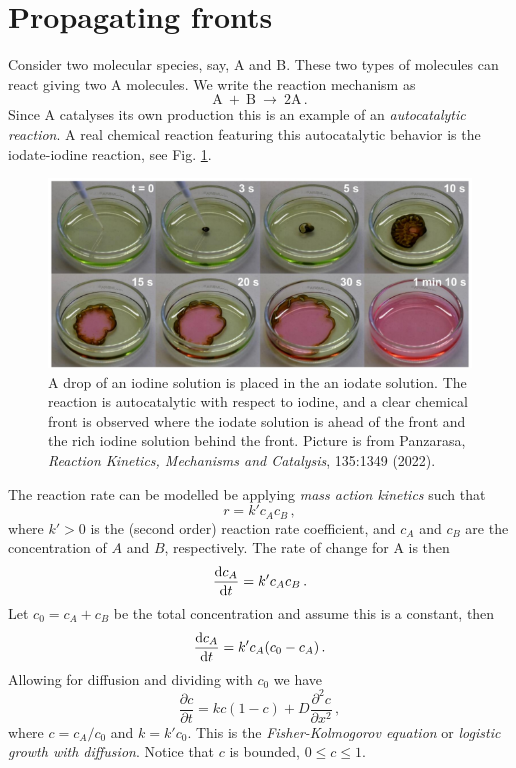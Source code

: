 \section{Propagating fronts}
Consider two molecular species, say, A and B. These two types of molecules can react giving two A
molecules. We write the reaction mechanism as
\begin{equation}
  \text{A} \ + \ \text{B} \ \rightarrow \ 2\text{A} \, . \label{react:FK} 
\end{equation}
Since A catalyses its own production this is an example of an \emph{autocatalytic
reaction}. A real chemical reaction featuring this autocatalytic behavior is the
iodate-iodine reaction, see Fig. \ref{fig:iodateiodine}.
\begin{figure}[h!]
	\begin{center}
		\includegraphics[scale=0.45]{figs/IodateIodine.png}
		\caption{\label{fig:iodateiodine}
		A drop of an iodine solution is placed in the an iodate solution. The reaction is 
		autocatalytic with respect to iodine, and a clear chemical front is observed where
		the iodate solution is ahead of the front and the rich iodine solution behind the front.
		Picture is from Panzarasa, \emph{Reaction Kinetics, Mechanisms and Catalysis}, 135:1349 (2022).
		}
	\end{center}
\end{figure}

The reaction rate can be modelled be applying \emph{mass action kinetics} such that
\begin{equation}
	\label{eq:rkcacb}
  r = k'c_Ac_B \, ,
\end{equation}
where $k'>0$ is the (second order) reaction rate coefficient, and $c_A$ and $c_B$ are the
concentration of $A$ and $B$, respectively. The rate of change for A is then
\begin{equation}
\label{eq:dcAdt}
  \frac{\mathrm{d} c_A}{\mathrm{d} t} = k'c_Ac_B \, .
\end{equation}
Let $c_0=c_A+c_B$ be the total concentration and assume this is a constant, then
\begin{equation}
  \frac{\mathrm{d} c_A}{\mathrm{d} t} = k'c_A(c_0 - c_A) \, .
\end{equation}
Allowing for diffusion and dividing with $c_0$ we have 
\begin{equation}
\frac{\partial c}{\partial t} = kc(1-c) + D \frac{\partial^2c}{\partial x^2}  \, ,
\end{equation}
where $c=c_A/c_0$ and $k=k'c_0$. This is the \emph{Fisher-Kolmogorov equation} or 
\emph{logistic growth with diffusion}. Notice that $c$ is bounded, $0 \leq c \leq 1$.

